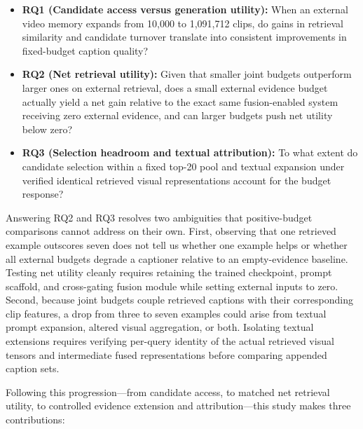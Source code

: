 \documentclass[11pt,a4paper]{article}
\begin{document}
\begin{itemize}
\item \textbf{RQ1 (Candidate access versus generation utility):} When an external video memory expands from 10,000 to 1,091,712 clips, do gains in retrieval similarity and candidate turnover translate into consistent improvements in fixed-budget caption quality?
\item \textbf{RQ2 (Net retrieval utility):} Given that smaller joint budgets outperform larger ones on external retrieval, does a small external evidence budget actually yield a net gain relative to the exact same fusion-enabled system receiving zero external evidence, and can larger budgets push net utility below zero?
\item \textbf{RQ3 (Selection headroom and textual attribution):} To what extent do candidate selection within a fixed top-20 pool and textual expansion under verified identical retrieved visual representations account for the budget response?
\end{itemize}
Answering RQ2 and RQ3 resolves two ambiguities that positive-budget comparisons cannot address on their own. First, observing that one retrieved example outscores seven does not tell us whether one example helps or whether all external budgets degrade a captioner relative to an empty-evidence baseline. Testing net utility cleanly requires retaining the trained checkpoint, prompt scaffold, and cross-gating fusion module while setting external inputs to zero. Second, because joint budgets couple retrieved captions with their corresponding clip features, a drop from three to seven examples could arise from textual prompt expansion, altered visual aggregation, or both. Isolating textual extensions requires verifying per-query identity of the actual retrieved visual tensors and intermediate fused representations before comparing appended caption sets.

Following this progression---from candidate access, to matched net retrieval utility, to controlled evidence extension and attribution---this study makes three contributions:
\end{document}

